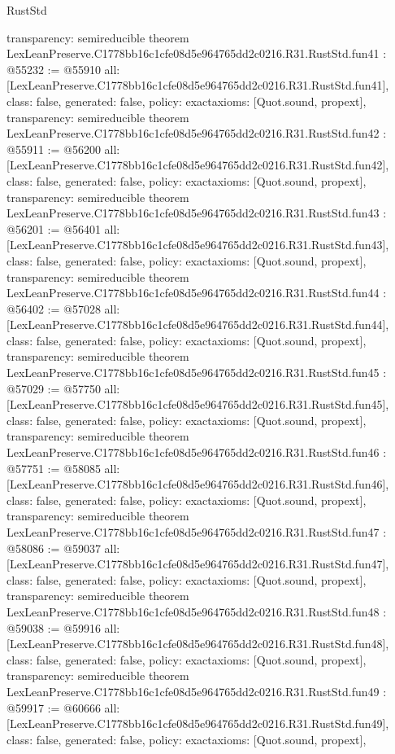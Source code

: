 \begin{lexlean}{RustStd}
\begin{coremodule}
{  transparency: semireducible
}
theorem LexLeanPreserve.C1778bb16c1cfe08d5e964765dd2c0216.R31.RustStd.fun41 : @55232 := @55910 {
  all: [LexLeanPreserve.C1778bb16c1cfe08d5e964765dd2c0216.R31.RustStd.fun41],
  class: false,
  generated: false,
  policy: exact{axioms: [Quot.sound, propext]},
  transparency: semireducible
}
theorem LexLeanPreserve.C1778bb16c1cfe08d5e964765dd2c0216.R31.RustStd.fun42 : @55911 := @56200 {
  all: [LexLeanPreserve.C1778bb16c1cfe08d5e964765dd2c0216.R31.RustStd.fun42],
  class: false,
  generated: false,
  policy: exact{axioms: [Quot.sound, propext]},
  transparency: semireducible
}
theorem LexLeanPreserve.C1778bb16c1cfe08d5e964765dd2c0216.R31.RustStd.fun43 : @56201 := @56401 {
  all: [LexLeanPreserve.C1778bb16c1cfe08d5e964765dd2c0216.R31.RustStd.fun43],
  class: false,
  generated: false,
  policy: exact{axioms: [Quot.sound, propext]},
  transparency: semireducible
}
theorem LexLeanPreserve.C1778bb16c1cfe08d5e964765dd2c0216.R31.RustStd.fun44 : @56402 := @57028 {
  all: [LexLeanPreserve.C1778bb16c1cfe08d5e964765dd2c0216.R31.RustStd.fun44],
  class: false,
  generated: false,
  policy: exact{axioms: [Quot.sound, propext]},
  transparency: semireducible
}
theorem LexLeanPreserve.C1778bb16c1cfe08d5e964765dd2c0216.R31.RustStd.fun45 : @57029 := @57750 {
  all: [LexLeanPreserve.C1778bb16c1cfe08d5e964765dd2c0216.R31.RustStd.fun45],
  class: false,
  generated: false,
  policy: exact{axioms: [Quot.sound, propext]},
  transparency: semireducible
}
theorem LexLeanPreserve.C1778bb16c1cfe08d5e964765dd2c0216.R31.RustStd.fun46 : @57751 := @58085 {
  all: [LexLeanPreserve.C1778bb16c1cfe08d5e964765dd2c0216.R31.RustStd.fun46],
  class: false,
  generated: false,
  policy: exact{axioms: [Quot.sound, propext]},
  transparency: semireducible
}
theorem LexLeanPreserve.C1778bb16c1cfe08d5e964765dd2c0216.R31.RustStd.fun47 : @58086 := @59037 {
  all: [LexLeanPreserve.C1778bb16c1cfe08d5e964765dd2c0216.R31.RustStd.fun47],
  class: false,
  generated: false,
  policy: exact{axioms: [Quot.sound, propext]},
  transparency: semireducible
}
theorem LexLeanPreserve.C1778bb16c1cfe08d5e964765dd2c0216.R31.RustStd.fun48 : @59038 := @59916 {
  all: [LexLeanPreserve.C1778bb16c1cfe08d5e964765dd2c0216.R31.RustStd.fun48],
  class: false,
  generated: false,
  policy: exact{axioms: [Quot.sound, propext]},
  transparency: semireducible
}
theorem LexLeanPreserve.C1778bb16c1cfe08d5e964765dd2c0216.R31.RustStd.fun49 : @59917 := @60666 {
  all: [LexLeanPreserve.C1778bb16c1cfe08d5e964765dd2c0216.R31.RustStd.fun49],
  class: false,
  generated: false,
  policy: exact{axioms: [Quot.sound, propext]},
}
\end{coremodule}
\end{lexlean}
